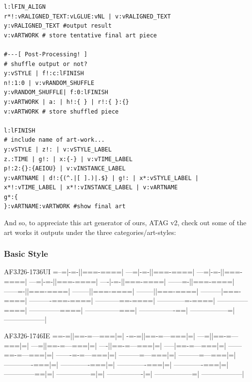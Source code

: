 \documentclass[a4paper, 18pt]{book} %
\begin{document}
{{{{\begin{tcolorbox}[teaterminalstyle, title=TEA Program: ABSTRACT TEXT-ART GENERATOR v2, breakable]
\begin{lstlisting}[language=TEA,breaklines=true,]
l:lFIN_ALIGN
r*!:vRALIGNED_TEXT:vLGLUE:vNL | v:vRALIGNED_TEXT
y:vRALIGNED_TEXT #output result
v:vARTWORK # store tentative final art piece

#---[ Post-Processing! ]
# shuffle output or not?
y:vSTYLE | f!:c:lFINISH
n!:1:0 | v:vRANDOM_SHUFFLE
y:vRANDOM_SHUFFLE| f:0:lFINISH
y:vARTWORK | a: | h!:{ } | r!:{ }:{}
v:vARTWORK # store shuffled piece

l:lFINISH
# include name of art-work...
y:vSTYLE | z!: | v:vSTYLE_LABEL
z.:TIME | g!: | x:{-} | v:vTIME_LABEL
p!:2:{}:{AEIOU} | v:vINSTANCE_LABEL
y:vARTNAME | d!:{(^.|[ ].)|.$} | g!: | x*:vSTYLE_LABEL | x*!:vTIME_LABEL | x*!:vINSTANCE_LABEL | v:vARTNAME
g*:{
}:vARTNAME:vARTWORK #show final art
   \end{lstlisting}
  \end{tcolorbox}
  \caption{TEA APPLICATION: ABSTRACT TEXT-ART GENERATOR (ATAG) v2}
  \label{FIGT2}
}


\vspace{2em}


And so, to appreciate this art generator of ours, ATAG v2, check out some of the art works it outputs under the three categories/art-styles:

\newpage

\subsubsection{Basic Style}


   \begin{tcbverbatim}[title=Sample OUTPUT 1 from ATAG v2]
AF3J26-1736UI
=--=|-=-||===-====|
---=|-=-||===-====|
---=|-=-||===-====|
---=|-=-||===-====|
----|-=-||===-====|
------=-||===-====|
------=-||===-====|
--------||===-====|
--------||===-====|
---------|===-====|
----------===-====|
-----------==-====|
------------=-====|
--------------====|
--------------====|
---------------===|
----------------==|
-----------------=|
------------------|
  \end{tcbverbatim}
  

\newpage



   \begin{tcbverbatim}[title=Sample OUTPUT 2 from ATAG v2]
AF3J26-1746IE
==-=||==-=---===|=|
-=-=||==-=---===|=|
---=||==-=---===|=|
---=||==-=---===|=|
----||==-=---===|=|
-----|==-=---===|=|
------==-=---===|=|
-------=-=---===|=|
---------=---===|=|
---------=---===|=|
-------------===|=|
-------------===|=|
-------------===|=|
-------------===|=|
--------------==|=|
---------------=|=|
----------------|=|
-----------------=|
------------------|
  \end{tcbverbatim}


}}}
\end{document}
